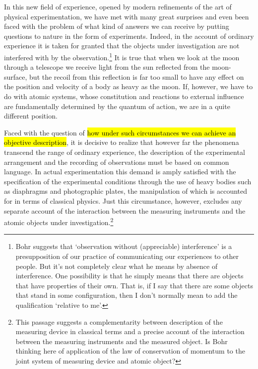 \documentclass{tufte-handout}
\begin{document}
In this new field of experience, opened by modern refinements of the
art of physical experimentation, we have met with many great surprises
and even been faced with the problem of what kind of answers we can
receive by putting questions to nature in the form of
experiments. Indeed, in the account of ordinary experience it is taken
for granted that the objects under investigation are not interfered
with by the observation.\footnote{Bohr suggests that `observation
  without (appreciable) interference' is a presupposition of our
  practice of communicating our experiences to other people. But it's
  not completely clear what he means by absence of interference. One
  possibility is that he simply means that there are objects that have
  properties of their own. That is, if I say that there are some
  objects that stand in some configuration, then I don't normally mean
  to add the qualification `relative to me'.}  It is true that when we
look at the moon through a telescope we receive light from the sun
reflected from the moon-surface, but the recoil from this reflection
is far too small to have any effect on the position and velocity of a
body as heavy as the moon. If, however, we have to do with atomic
systems, whose constitution and reactions to external influence are
fundamentally determined by the quantum of action, we are in a quite
different position.

Faced with the question of \hl{how under such circumstances we can
  achieve an objective description}, it is decisive to realize that
however far the phenomena transcend the range of ordinary experience,
the description of the experimental arrangement and the recording of
observations must be based on common language. In actual
experimentation this demand is amply satisfied with the specification
of the experimental conditions through the use of heavy bodies such as
diaphragms and photographic plates, the manipulation of which is
accounted for in terms of classical physics. Just this circumstance,
however, excludes any separate account of the interaction between the
measuring instruments and the atomic objects under
investigation.\footnote{This passage suggests a complementarity
  between description of the measuring device in classical terms and a
  precise account of the interaction between the measuring instruments
  and the measured object. Is Bohr thinking here of application of the
  law of conservation of momentum to the joint system of measuring
  device and atomic object?}
\end{document}
